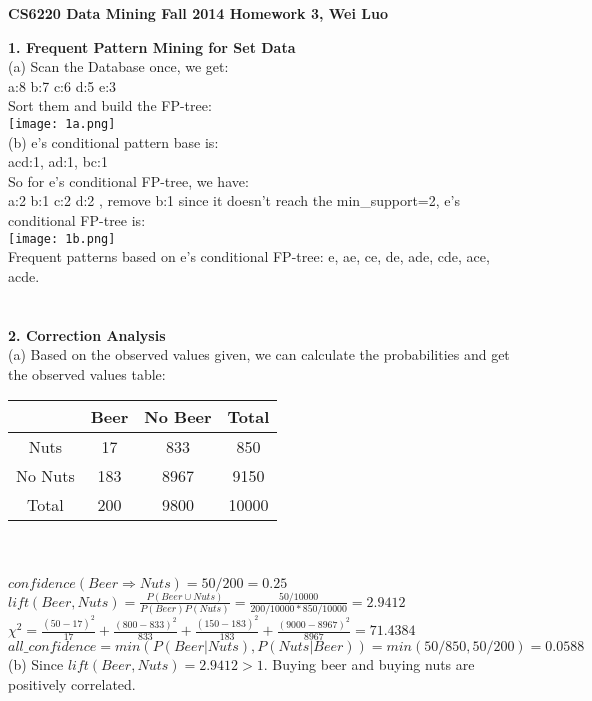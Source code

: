 \documentclass[11pt,a4paper,fleqn]{article}
\begin{document}
\begin{center}
\textbf{CS6220 Data Mining Fall 2014 Homework 3, Wei Luo}\\
\end{center}
\textbf{1. Frequent Pattern Mining for Set Data}\\
(a) Scan the Database once, we get:\\
a:8 b:7 c:6 d:5 e:3\\
Sort them and build the FP-tree:\\
\texttt{[image: 1a.png]}\\
(b) e's conditional pattern base is:\\
acd:1, ad:1, bc:1\\
So for e's conditional FP-tree, we have:\\
a:2 b:1 c:2 d:2 , remove b:1 since it doesn't reach the min\_support=2, e's conditional FP-tree is:\\
\texttt{[image: 1b.png]}\\
Frequent patterns based on e's conditional FP-tree: e, ae, ce, de, ade, cde, ace, acde.\\ \\ \\
\textbf{2. Correction Analysis}\\
(a) Based on the observed values given, we can calculate the probabilities and get the observed values table:\\
\begin{tabular}{|c|c|c|c|}
\hline
 &Beer&No Beer&Total\\
\hline
Nuts&17&833&850\\
\hline
No Nuts&183&8967&9150\\
\hline
Total&200&9800&10000\\
\hline
\end{tabular}\\ \\
$confidence(Beer \Rightarrow Nuts) = 50/200 = 0.25$\\
$lift(Beer,Nuts) = \frac{P(Beer \cup Nuts)}{P(Beer)P(Nuts)} = \frac{50/10000}{200/10000*850/10000} = 2.9412$\\
$\chi ^2 = \frac{(50-17)^2}{17}+\frac{(800-833)^2}{833}+\frac{(150-183)^2}{183}+\frac{(9000-8967)^2}{8967}= 71.4384$\\
$all\_confidence = min(P(Beer|Nuts),P(Nuts|Beer)) = min(50/850, 50/200) = 0.0588$\\
(b) Since $lift(Beer,Nuts) = 2.9412 > 1$. Buying beer and buying nuts are positively correlated.\\
\end{document}
